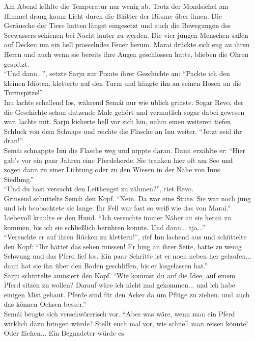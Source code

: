 Am Abend kühlte die Temperatur nur wenig ab. Trotz der Mondsichel am Himmel drang kaum Licht durch 
die Blätter der Bäume über ihnen. Die Geräusche der Tiere hatten längst eingesetzt und auch die 
Bewegungen des Seewassers schienen bei Nacht lauter zu werden. Die vier jungen Menschen saßen auf 
Decken um ein hell prasselndes Feuer herum. Marai drückte sich eng an ihren Herrn und auch wenn sie 
bereits ihre Augen geschlossen hatte, blieben die Ohren gespitzt. \\
``Und dann...'', setzte Sarju zur Pointe ihrer Geschichte an: ``Packte ich den kleinen Idioten, 
kletterte auf den Turm und hängte ihn an seinen Hosen an die Turmspitze!''\\
Inu lachte schallend los, während Semái nur wie üblich grinste. Sogar Revo, der die Geschichte schon 
dutzende Male gehört und vermutlich sogar dabei gewesen war, lachte mit. Sarju kicherte hell vor 
sich hin, nahm einen weiteren tiefen Schluck von dem Schnaps und reichte die Flasche an Inu 
weiter. ``Jetzt seid ihr dran!''\\
Semái schnappte Inu die Flasche weg und nippte daran. Dann erzählte er: ``Hier gab's vor ein paar 
Jahren eine Pferdeherde. Sie tranken hier oft am See und zogen dann zu einer Lichtung oder zu den 
Wiesen in der Nähe von Inus Siedlung.''\\
``Und du hast versucht den Leithengst zu zähmen?'', riet Revo.\\
Grinsend schüttelte Semái den Kopf. ``Nein. Da war eine Stute. Sie war noch jung und ich 
beobachtete sie lange. Ihr Fell war fast so weiß wie das von Marai.'' Liebevoll kraulte er den 
Hund. ``Ich versuchte immer Näher an sie heran zu kommen, bis ich sie schließlich berühren konnte. 
Und dann... tja...''\\
``Versuchte er auf ihren Rücken zu klettern!'', rief Inu lachend aus und schüttelte den Kopf: ``Ihr 
hättet das sehen müssen! Er hing an ihrer Seite, hatte zu wenig Schwung und das Pferd lief los. Ein 
paar Schritte ist er noch neben her gelaufen... dann hat sie ihn über den Boden geschliffen, bis er 
losgelassen hat.''\\
Sarju schüttelte amüsiert den Kopf. ``Wie kommst du auf die Idee, auf einem Pferd sitzen zu wollen? 
Darauf wäre ich nicht mal gekommen... und ich habe einigen Mist gebaut. Pferde sind für den Acker 
da um Pflüge zu ziehen. und auch das können Ochsen besser.''\\
Semái beugte sich verschwörerisch vor. ``Aber was wäre, wenn man ein Pferd wirklich dazu bringen 
würde? Stellt euch mal vor, wie schnell man reisen könnte! Oder fliehen... Ein Begnadeter würde es 

